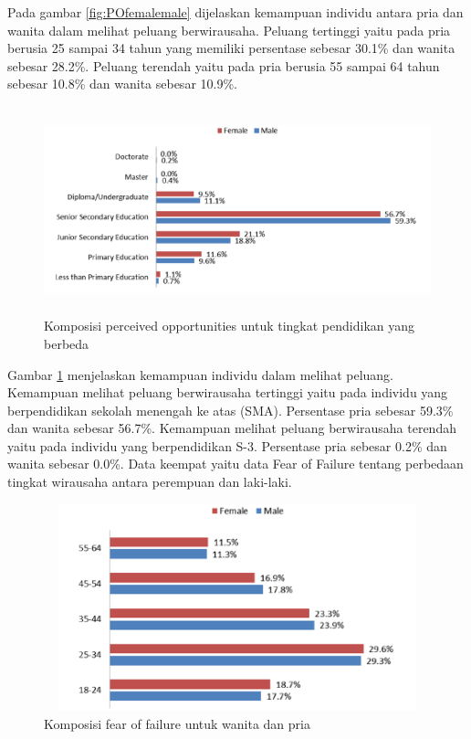 Pada gambar \ref{fig:POfemalemale} dijelaskan kemampuan individu antara pria dan wanita dalam melihat peluang berwirausaha. Peluang tertinggi yaitu pada pria berusia 25 sampai 34 tahun yang memiliki persentase sebesar 30.1\% dan wanita sebesar 28.2\%. Peluang terendah yaitu pada pria berusia 55 sampai 64 tahun sebesar 10.8\% dan wanita sebesar 10.9\%. 

\begin{figure} [H]
	\centering  
	\includegraphics[width=14cm, height=6cm]{POpendidikan} 
	\caption[Komposisi perceived opportunities untuk tingkat pendidikan yang berbeda]{Komposisi perceived opportunities untuk tingkat pendidikan yang berbeda} 
	\label{fig:POpendidikan} 
\end{figure}  

Gambar \ref{fig:POpendidikan} menjelaskan kemampuan individu dalam melihat peluang. Kemampuan melihat peluang berwirausaha tertinggi yaitu pada individu yang berpendidikan sekolah menengah ke atas (SMA). Persentase pria sebesar 59.3\% dan wanita sebesar 56.7\%. Kemampuan melihat peluang berwirausaha terendah yaitu pada individu yang berpendidikan S-3. Persentase pria sebesar 0.2\% dan wanita sebesar 0.0\%. Data keempat yaitu data Fear of Failure tentang perbedaan tingkat wirausaha antara perempuan dan laki-laki.

\begin{figure} [H]
	\centering  
	\includegraphics[width=13cm, height=6cm]{FOFfemalemale} 
	\caption[Komposisi fear of failure untuk wanita dan pria]{Komposisi fear of failure untuk wanita dan pria} 
	\label{fig:FOF} 
\end{figure}  

